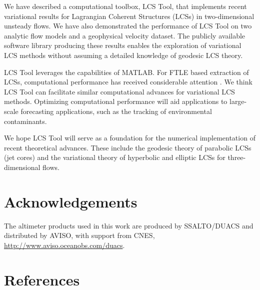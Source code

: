 \documentclass[5p]{elsarticle}
\begin{document}
We have described a computational toolbox, LCS Tool, that implements recent variational results for Lagrangian Coherent Structures (LCSs) in two-dimensional unsteady flows. We have also demonstrated the performance of LCS Tool on two analytic flow models and a geophysical velocity dataset. The publicly available software library producing these results enables the exploration of variational LCS methods without assuming a detailed knowledge of geodesic LCS theory.

LCS Tool leverages the capabilities of MATLAB. For FTLE based extraction of LCSs, computational performance has received considerable attention \citep{conti12:_gpu_apu_finit_time_lyapun_expon,miron12:_anisot_lagran_coher_struc}.
We think LCS Tool can facilitate similar computational advances for variational LCS methods.
Optimizing computational performance will aid applications to large-scale forecasting applications, such as the tracking of environmental contaminants\citep{olascoaga12:_forec}.

We hope LCS Tool will serve as a foundation for the numerical implementation of recent theoretical advances.
These include the geodesic theory of parabolic LCSs (jet cores)\citep{farazmand14:_shearless} and the variational theory of hyperbolic and elliptic LCSs for three-dimensional flows\citep{blazevski14:_hyper_ellip_trans_barrier_three}.

\section*{Acknowledgements}

\begin{sloppypar}
The altimeter products used in this work are produced by SSALTO/DUACS and distributed by AVISO, with support from CNES, \url{http://www.aviso.oceanobs.com/duacs}.
\end{sloppypar}

\section*{References}

 

\end{document}
